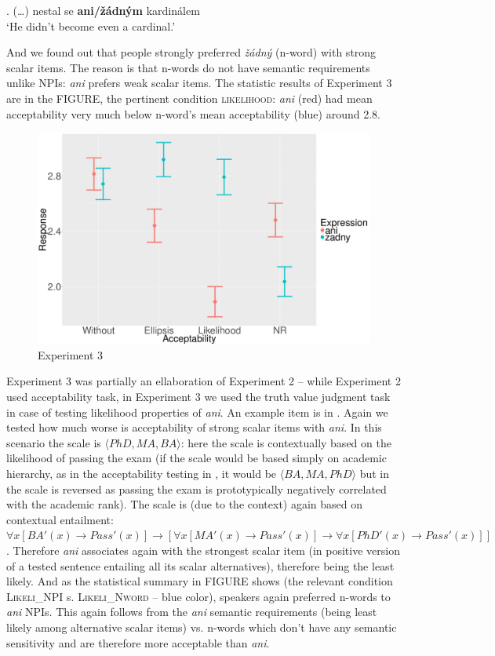 \documentclass[12pt]{scrartcl}
\begin{document}
\ex. (\ldots{}) nestal se \textbf{ani/žádným} kardinálem\\
`He didn't become even a cardinal.'

And we found out that people strongly preferred \emph{žádný} (n-word) with strong scalar items. The reason is that n-words do not have semantic requirements unlike NPIs: \textit{ani} prefers weak scalar items. The statistic results of Experiment 3 are in the FIGURE, the pertinent condition \textsc{likelihood}: \textit{ani} (red) had mean acceptability very much below n-word's mean acceptability (blue) around 2.8. 

\begin{figure}
\centering
\includegraphics{include/mean-sum.png}
\caption{Experiment 3}
\end{figure}

Experiment 3 was partially an ellaboration of Experiment 2 -- while Experiment 2 used acceptability task, in Experiment 3 we used the truth value judgment task in case of testing likelihood properties of \textit{ani}. An example item is in \Next. Again we tested how much worse is acceptability of strong scalar items with \textit{ani}. In this scenario the scale is $\langle PhD,MA,BA\rangle$: here the scale is contextually based on the likelihood of passing the exam (if the scale would be based simply on academic hierarchy, as in the acceptability testing in \Last, it would be $\langle BA,MA,PhD\rangle$ but in \Next the scale is reversed as passing the exam is prototypically negatively correlated with the academic rank). The scale is (due to the context) again based on contextual entailment: $\forall x[BA'(x) \rightarrow  Pass'(x)] \rightarrow [\forall x[MA'(x) \rightarrow Pass'(x)] \rightarrow \forall x[PhD'(x) \rightarrow Pass'(x)]]$. Therefore \textit{ani} associates again with the strongest scalar item (in positive version of a tested sentence entailing all its scalar alternatives), therefore being the least likely. And as the statistical summary in FIGURE shows (the relevant condition \textsc{Likeli\_NPI} s. \textsc{Likeli\_Nword} -- blue color), speakers again preferred n-words to \textit{ani} NPIs.  This again follows from the \textit{ani} semantic requirements (being least likely among alternative scalar items)  vs. n-words which don't have any semantic sensitivity and are therefore more acceptable than \textit{ani}. 
\end{document}
